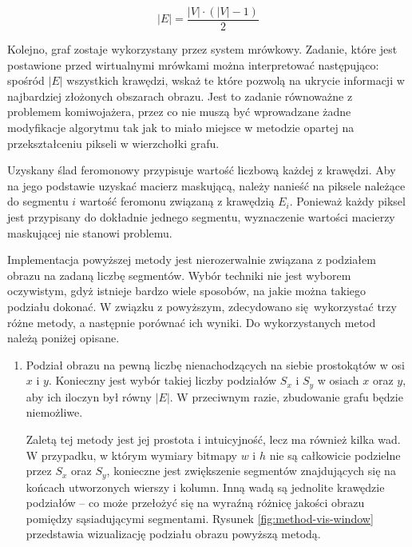 {{{            \begin{equation}\label{eqt:edge-based-converter-cond}
                |E| = \frac{|V| \cdot (|V| - 1)}{2}
            \end{equation}

            Kolejno, graf zostaje wykorzystany przez system mrówkowy. Zadanie, które jest postawione przed wirtualnymi
            mrówkami można interpretować następująco: spośród $|E|$ wszystkich krawędzi, wskaż te które pozwolą
            na ukrycie informacji w najbardziej złożonych obszarach obrazu. Jest to zadanie równoważne z problemem
            komiwojażera, przez co nie muszą być wprowadzane żadne modyfikacje algorytmu tak jak to miało miejsce w
            metodzie opartej na przekształceniu pikseli w wierzchołki grafu.

            Uzyskany ślad feromonowy przypisuje wartość liczbową każdej z krawędzi. Aby na jego podstawie uzyskać
            macierz maskującą, należy nanieść na piksele należące do segmentu $i$ wartość feromonu związaną z krawędzią
            $E_i$. Ponieważ każdy piksel jest przypisany do dokładnie jednego segmentu, wyznaczenie wartości macierzy
            maskującej nie stanowi problemu.

            Implementacja powyższej metody jest nierozerwalnie związana z podziałem obrazu na zadaną liczbę segmentów.
            Wybór techniki nie jest wyborem oczywistym, gdyż istnieje bardzo wiele sposobów, na jakie można takiego
            podziału dokonać. W związku z powyższym, zdecydowano się wykorzystać trzy różne metody, a następnie porównać
            ich wyniki. Do wykorzystanych metod należą poniżej opisane.

            \begin{enumerate}
                \item Podział obrazu na pewną liczbę nienachodzących na siebie prostokątów w osi $x$ i $y$. Konieczny
                jest wybór takiej liczby podziałów $S_x$ i $S_y$ w osiach $x$ oraz $y$, aby ich iloczyn był równy $|E|$.
                W przeciwnym razie, zbudowanie grafu będzie niemożliwe.

                Zaletą tej metody jest jej prostota i intuicyjność, lecz ma również kilka wad. W przypadku, w którym
                wymiary bitmapy $w$ i $h$ nie są całkowicie podzielne przez $S_x$ oraz $S_y$, konieczne jest zwiększenie
                segmentów znajdujących się na końcach utworzonych wierszy i kolumn. Inną wadą są jednolite krawędzie
                podziałów -- co może przełożyć się na wyraźną różnicę jakości obrazu pomiędzy sąsiadującymi segmentami.
                Rysunek \ref{fig:method-vis-window} przedstawia wizualizację podziału obrazu powyższą metodą.


\end{enumerate}}}}
